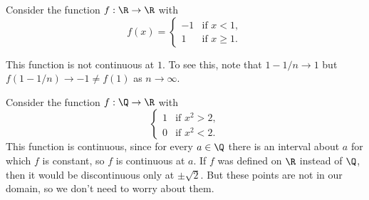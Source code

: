 \documentclass[a4paper]{scrartcl}
\begin{document}
\begin{example}
	Consider the function $f : \R \rightarrow \R$ with
	$$
	f(x) = \begin{cases}
        -1 &\mbox{if } x < 1, \\
        1 &\mbox{if } x \geq 1.
       \end{cases}
	$$
	\begin{center}
	\end{center}

	This function is not continuous at $1$. To see this, note that $1 - 1/n \rightarrow 1$ but $f(1 - 1/n) \rightarrow -1 \neq f(1)$ as $n \rightarrow \infty$.
\end{example}

\begin{example}
Consider the function $f: \Q \rightarrow \R$ with
$$
\begin{cases}
	1 &\mbox{if } x^2 > 2, \\
	0 &\mbox{if } x^2 < 2.
   \end{cases}
$$
This function is continuous, since for every $a \in \Q$ there is an interval about $a$ for which $f$ is constant, so $f$ is continuous at $a$. If $f$ was defined on $\R$ instead of $\Q$, then it would be discontinuous only at $\pm\sqrt{2}$. But these points are not in our domain, so we don't need to worry about them.
\end{example}
\end{document}
